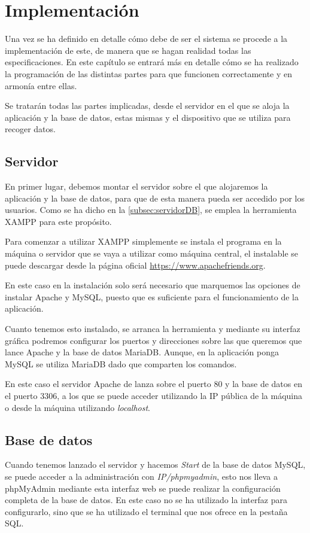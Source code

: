 \chapter{Implementación}
\label{ch:implementacion}
Una vez se ha definido en detalle cómo debe de ser el sistema se procede a la implementación de este, de manera que se hagan realidad todas las especificaciones. En este capítulo se entrará más en detalle cómo se ha realizado la programación de las distintas partes para que funcionen correctamente y en armonía entre ellas.

Se tratarán todas las partes implicadas, desde el servidor en el que se aloja la aplicación y la base de datos, estas mismas y el dispositivo que se utiliza para recoger datos.

\section{Servidor}
En primer lugar, debemos montar el servidor sobre el que alojaremos la aplicación y la base de datos, para que de esta manera pueda ser accedido por los usuarios. Como se ha dicho en la \autoref{subsec:servidorDB}, se emplea la herramienta XAMPP para este propósito.

Para comenzar a utilizar XAMPP simplemente se instala el programa en la máquina o servidor que se vaya a utilizar como máquina central, el instalable se puede descargar desde la página oficial \href{https://www.apachefriends.org/index.html}{https://www.apachefriends.org}.

En este caso en la instalación solo será necesario que marquemos las opciones de instalar Apache y MySQL, puesto que es suficiente para el funcionamiento de la aplicación.

Cuanto tenemos esto instalado, se arranca la herramienta y mediante su interfaz gráfica podremos configurar los puertos y direcciones sobre las que queremos que lance Apache y la base de datos MariaDB. Aunque, en la aplicación ponga MySQL se utiliza MariaDB dado que comparten los comandos.

En este caso el servidor Apache de lanza sobre el puerto 80 y la base de datos en el puerto 3306, a los que se puede acceder utilizando la IP pública de la máquina o desde la máquina utilizando \textit{localhost}.

\section{Base de datos}
Cuando tenemos lanzado el servidor y hacemos \textit{Start} de la base de datos MySQL, se puede acceder a la administración con \textit{IP/phpmyadmin}, esto nos lleva a phpMyAdmin mediante esta interfaz web se puede realizar la configuración completa de la base de datos. En este caso no se ha utilizado la interfaz para configurarlo, sino que se ha utilizado el terminal que nos ofrece en la pestaña SQL. 
\pagebreak

